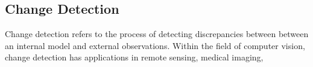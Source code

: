 \subsection{Change Detection}

Change detection refers to the process of detecting discrepancies between between an internal model and external observations. Within the field of computer vision, change detection has applications in remote sensing, medical imaging, 